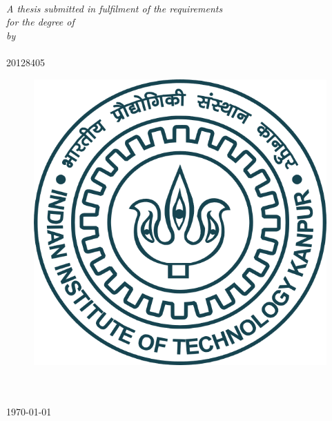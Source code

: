 \begin{titlepage}
\begin{center}

\HRule \\[0.4cm] %
{\huge \bfseries \ttitle}\\[0.4cm] %
\HRule \\[1.5cm] %
 
\large \textit{A thesis submitted in fulfilment of the requirements\\ for the degree of \degreename}\\[0.3cm] %
\textit{by}\\[0.4cm]
\authornames \\
20128405 \\ [0.4cm]



\vfill
\graphicspath{ {./Figures/} }
\begin{figure}[hb]
  \centering
  \includegraphics[width=0.35\linewidth]{Images/iitk_logo.png}
\end{figure}

\DEPTNAME\\ %
\textsc{ \UNIVNAME}\\[1.5cm] %
\large \today\\[2cm] %

\end{center}

\end{titlepage}